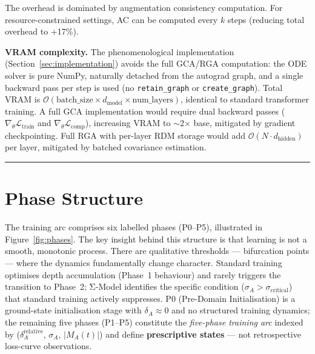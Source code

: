 The overhead is dominated by augmentation consistency computation.
For resource-constrained settings, AC can be computed every $k$ steps
(reducing total overhead to +17\%).

\textbf{VRAM complexity.} The phenomenological implementation (Section~\ref{sec:implementation})
avoids the full GCA/RGA computation: the ODE solver is pure NumPy, naturally
detached from the autograd graph, and a single backward pass per step is used
(no \texttt{retain\_graph} or \texttt{create\_graph}). Total VRAM is
$\mathcal{O}(\text{batch\_size} \times d_{\text{model}} \times
\text{num\_layers})$, identical to standard transformer training.
A full GCA implementation would require dual backward passes
($\nabla_\theta\mathcal{L}_{\text{train}}$ and
$\nabla_\theta\mathcal{L}_{\text{comp}}$), increasing VRAM to
$\sim$2$\times$ base, mitigated by gradient checkpointing.
Full RGA with per-layer RDM storage would add
$\mathcal{O}(N \cdot d_{\text{hidden}})$ per layer, mitigated by batched
covariance estimation.

\noindent\rule{\linewidth}{0.4pt}


\section{Phase Structure}\label{sec:phase-structure}

The training arc comprises six labelled phases (P0--P5), illustrated in Figure~\ref{fig:phases}. The key insight behind this structure is that learning is not a smooth, monotonic process. There are qualitative thresholds --- bifurcation points --- where the dynamics fundamentally change character. Standard training optimises depth accumulation (Phase~1 behaviour) and rarely triggers the transition to Phase~2; Σ-Model identifies the specific condition ($\sigma_A > \sigma_{\text{critical}}$) that standard training actively suppresses. P0
(Pre-Domain Initialisation) is a ground-state initialisation stage
with $\delta_A \approx 0$ and no structured training dynamics; the
remaining five phases (P1--P5) constitute the \emph{five-phase
training arc} indexed by
($\delta_A^{\text{relative}}$, $\sigma_A$, $|M_A(t)|$) and define
\textbf{prescriptive states} --- not retrospective loss-curve
observations.

